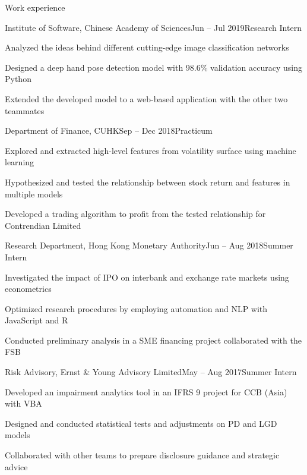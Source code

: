 \documentclass[10pt]{resume} %
\begin{document}

\begin{rSection}{Work experience}

\begin{rSubsection}{Institute of Software, Chinese Academy of Sciences}{Jun -- Jul 2019}{Research Intern}{}
\item Analyzed the ideas behind different cutting-edge image classification networks
\item Designed a deep hand pose detection model with 98.6\% validation accuracy using Python
\item Extended the developed model to a web-based application with the other two teammates
\end{rSubsection}


\begin{rSubsection}{Department of Finance, CUHK}{Sep -- Dec 2018}{Practicum}{}
\item Explored and extracted high-level features from volatility surface using machine learning
\item Hypothesized and tested the relationship between stock return and features in multiple models
\item Developed a trading algorithm to profit from the tested relationship for Contrendian Limited
\end{rSubsection}


\begin{rSubsection}{Research Department, Hong Kong Monetary Authority}{Jun -- Aug 2018}{Summer Intern}{}
\item Investigated the impact of IPO on interbank and exchange rate markets using econometrics
\item Optimized research procedures by employing automation and NLP with JavaScript and R
\item Conducted preliminary analysis in a SME financing project collaborated with the FSB
\end{rSubsection}


\begin{rSubsection}{Risk Advisory, Ernst \& Young Advisory Limited}{May -- Aug 2017}{Summer Intern}{}
\item Developed an impairment analytics tool in an IFRS 9 project for CCB (Asia) with VBA
\item Designed and conducted statistical tests and adjustments on PD and LGD models
\item Collaborated with other teams to prepare disclosure guidance and strategic advice
\end{rSubsection}

\end{rSection}
\end{document}
